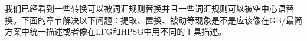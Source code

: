 
我们已经看到一些转换可以被词汇规则替换并且一些词汇规则可以被空中心语替换。下面的章节解决以下问题：提取、置换、被动等现象是不是应该像在GB/最简方案中统一描述或者像在LFG和HPSG中用不同的工具描述。



